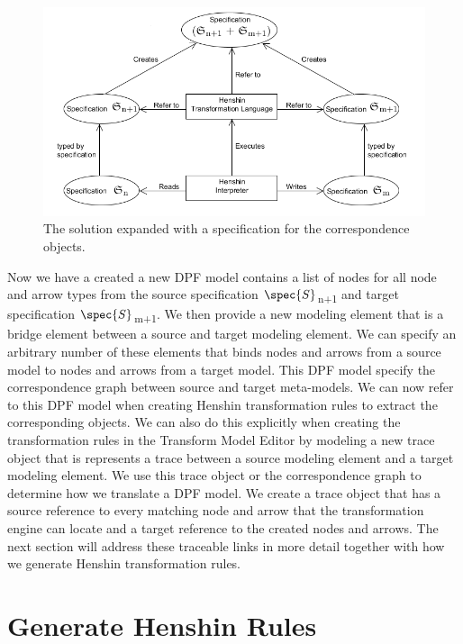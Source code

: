 \begin{figure}[H]
	\centering
	\includegraphics[scale=0.7]{./Figures/TransformationSolution_Correspond.png}
	\caption[Specification for the correspondence objects]
	{The solution expanded with a specification for the correspondence objects.}
	\label{fig:Solution_CorrespondanceObjects}
\end{figure}

Now we have a created a new DPF model contains a list of nodes for all node and
arrow types from the source specification $\spec{S}$\textsubscript{n+1} and
target specification $\spec{S}$\textsubscript{m+1}. We then provide a new
modeling element that is a bridge element between a source and target modeling
element. We can specify an arbitrary number of these elements that binds nodes
and arrows from a source model to nodes and arrows from a target model. This DPF
model specify the correspondence graph between source and target meta-models. We
can now refer to this DPF model when creating Henshin transformation rules to
extract the corresponding objects. We can also do this explicitly when creating
the transformation rules in the Transform Model Editor by modeling a new trace
object that is represents a trace between a source modeling element and a
target modeling element. We use this trace object or the correspondence graph to
determine how we translate a DPF model. We create a trace object that has a
source reference to every matching node and arrow that the transformation engine
can locate and a target reference to the created nodes and arrows. The next
section will address these traceable links in more detail together with how we
generate Henshin transformation rules. 


\section{Generate Henshin Rules}

